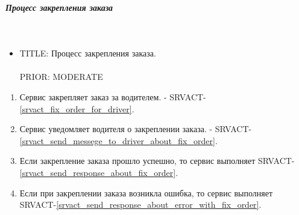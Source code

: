     \subparagraph{Процесс закрепления заказа} \mbox{} \\

        \begin{itemize}

	        \item {
	          TITLE: Процесс закрепления заказа.\\
	          \\
	          PRIOR: MODERATE\\
	        }

     	   \end{itemize}

        \begin{alg} \label{alg_order_fastening} \mbox{}

	        \begin{enumerate}

	          \item Сервис закрепляет заказ за водителем. - SRVACT-\ref{srvact_fix_order_for_driver}.

	          \item Сервис уведомляет водителя о закреплении заказа. - SRVACT-\ref{srvact_send_messege_to_driver_about_fix_order}.
	          
	          \item Если закрепление заказа прошло успешно, то сервис выполняет SRVACT-\ref{srvact_send_response_about_fix_order}. 

	          \item Если при закреплении заказа возникла ошибка, то сервис выполняет SRVACT-\ref{srvact_send_response_about_error_with_fix_order}. 
	        \end{enumerate}

        	\end{alg}

